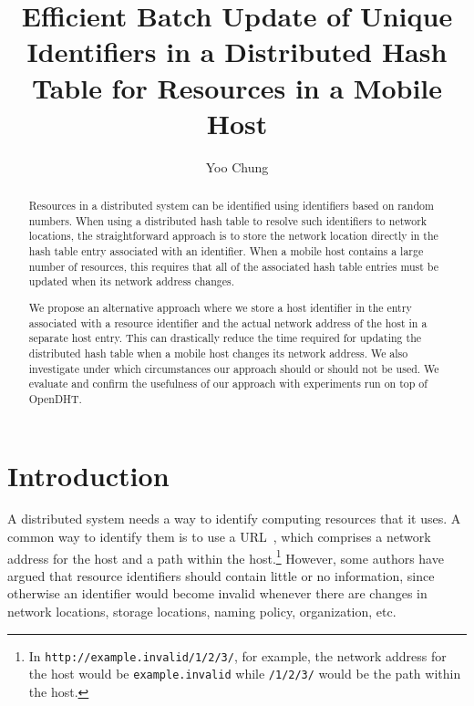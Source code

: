 \documentclass{article}
\begin{document}
\title{Efficient Batch Update of Unique Identifiers in a Distributed
  Hash Table for Resources in a Mobile Host}
\author{Yoo Chung}
\maketitle

\begin{abstract}
  Resources in a distributed system can be identified using
  identifiers based on random numbers.  When using a distributed hash
  table to resolve such identifiers to network locations, the
  straightforward approach is to store the network location directly
  in the hash table entry associated with an identifier.  When a
  mobile host contains a large number of resources, this requires that
  all of the associated hash table entries must be updated when its
  network address changes.

  We propose an alternative approach where we store a host identifier
  in the entry associated with a resource identifier and the actual
  network address of the host in a separate host entry.  This can
  drastically reduce the time required for updating the distributed
  hash table when a mobile host changes its network address.  We also
  investigate under which circumstances our approach should or should
  not be used.  We evaluate and confirm the usefulness of our approach
  with experiments run on top of OpenDHT.
\end{abstract}


\section{Introduction}
\label{sec:intro}

A distributed system needs a way to identify computing resources that
it uses.  A common way to identify them is to use a
URL~\cite{rfc1738}, which comprises a network address for the host and
a path within the host.\footnote{In
  \texttt{http://example.invalid/1/2/3/}, for example, the network
  address for the host would be \texttt{example.invalid} while
  \texttt{/1/2/3/} would be the path within the host.}  However, some
authors have argued that resource identifiers should contain little or
no information, since otherwise an identifier would become invalid
whenever there are changes in network locations, storage locations,
naming policy, organization,
etc.~\cite{w:cooluri,steen:comm1998,walfish:nsdi2004}
\end{document}

